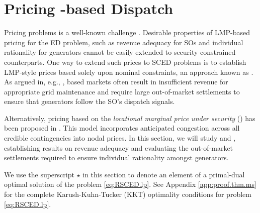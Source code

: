 
\section{Pricing \RSCED{}-based Dispatch}
\label{sec:pricing}


Pricing \SCED{} problems is a well-known challenge \cite{shi2022scenario}. Desirable properties of LMP-based pricing for the ED problem, such as revenue adequacy for SOs and individual rationality for generators cannot be easily extended to security-constrained counterparts. One way to extend such prices to SCED problems is to establish LMP-style prices based solely upon nominal constraints, an approach known as \LMPnom{}. 
As argued in, e.g., \cite{hogan2013electricity}, 
\LMPnom{} based markets often result in insufficient revenue for appropriate grid maintenance and require large out-of-market settlements to ensure that generators follow the SO's dispatch signals. 

Alternatively, pricing based on the 
\emph{locational marginal price under security} (\LMPmar{})
has been proposed in \cite{galiana2005scheduling}. This model incorporates anticipated congestion across all credible contingencies into nodal prices. In this section, we will study \LMPnom{} and \LMPmar{}, establishing results on revenue adequacy and evaluating the out-of-market settlements required to ensure individual rationality amongst generators.  

We use the superscript $\star$ in this section to denote an element of a primal-dual optimal solution of the \RSCED{} problem \eqref{eq:RSCED.lp}. See Appendix \ref{app:proof.thm.ms} for the complete Karush-Kuhn-Tucker (KKT) optimality conditions for problem \eqref{eq:RSCED.lp}. 

